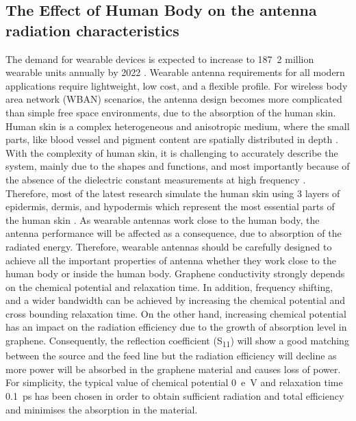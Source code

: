 \documentclass[12pt]{suhbook}
\begin{document}
\subsection{The Effect of Human Body on the antenna radiation characteristics}
The demand for wearable devices is expected to increase to  \si{187.2}  million wearable units annually by \si{2022} \cite{hernandez2019wearable}. Wearable antenna requirements for all modern applications require lightweight, low cost, and a flexible profile. For wireless body area network (WBAN) scenarios, the antenna design becomes more complicated than simple free space environments, due to the absorption of the human skin. Human skin is a complex heterogeneous and anisotropic medium, where the small parts, like blood vessel and pigment content are spatially distributed in depth \cite{flynn2011modeling}. With the complexity of human skin, it is challenging to accurately describe the system, mainly due to the shapes and functions, and most importantly because of the absence of the dielectric constant measurements at high frequency \cite{alekseev2007human}. Therefore, most of the latest research simulate the human skin using \si{3} layers of epidermis, dermis, and hypodermis which represent the most essential parts of the human skin \cite{lynch1989growth}. As wearable antennas work close to the human body, the antenna performance will be affected as a consequence, due to absorption of the radiated energy. Therefore, wearable antennas should be carefully designed to achieve all the important properties of antenna whether they work close to the human body or inside the human body. Graphene conductivity strongly depends on the chemical potential and relaxation time. In addition, frequency shifting, and a wider bandwidth can be achieved by increasing the chemical potential and cross bounding relaxation time. On the other hand, increasing chemical potential has an impact on the radiation efficiency due to the growth of absorption level in graphene. Consequently, the reflection coefficient (\si{S_{11}}) will show a good matching between the source and the feed line but the radiation efficiency will decline as more power will be absorbed in the graphene material and causes loss of power. For simplicity, the typical value of chemical potential \SI{0}{e \volt} and relaxation time \SI{0.1}{\pico \second } has been chosen in order to obtain sufficient radiation and total efficiency and minimises the absorption in the material.
\end{document}

